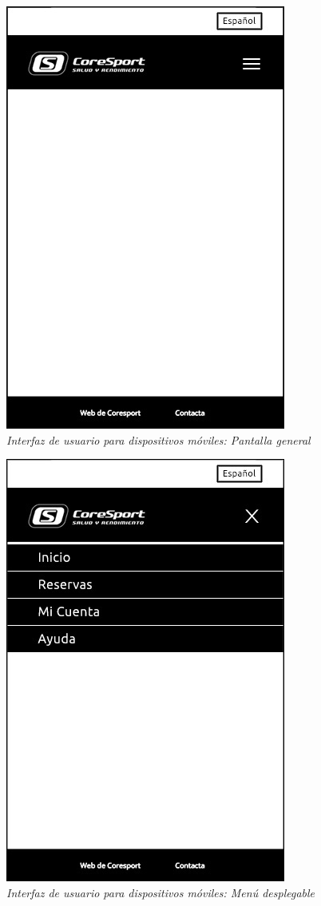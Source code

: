\begin{figure}[H]
\centering
  \includegraphics[scale=.50]{img/interfaz/pantalla-principal-movil.jpg}
  \caption{\textit{Interfaz de usuario para dispositivos móviles: Pantalla general}}
  \label{fig:interfaz-pantalla-principal-movil}
\end{figure}

\begin{figure}[H]
\centering
  \includegraphics[scale=.50]{img/interfaz/menu-movil.jpg}
  \caption{\textit{Interfaz de usuario para dispositivos móviles: Menú desplegable}}
  \label{fig:interfaz-menu-movil}
\end{figure}


